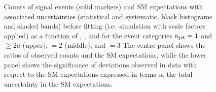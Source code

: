 \begin{figure}
\begin{center}
  \caption{Counts of signal events (solid markers) and SM expectations
    with associated uncertainties (statistical and systematic, black
    histograms and shaded bands) 
    before fitting (i.e.\ simulation with scale factors applied)
    as a function of \nb, \scalht, and \mht for the event categories
    $n_{\text{jet}} = 1$ and ${\geq}2a$ (upper), $=2$ (middle), and $=3$
    The centre panel shows the ratios of
    observed counts and the SM expectations, while the lower panel
    shows the significance of deviations observed in data with respect
    to the SM expectations expressed in terms of the total uncertainty
    in the SM expectations.
    }
        \label{fig:T1qqqqLL_no-fit_123}
    \end{center}
\end{figure}

